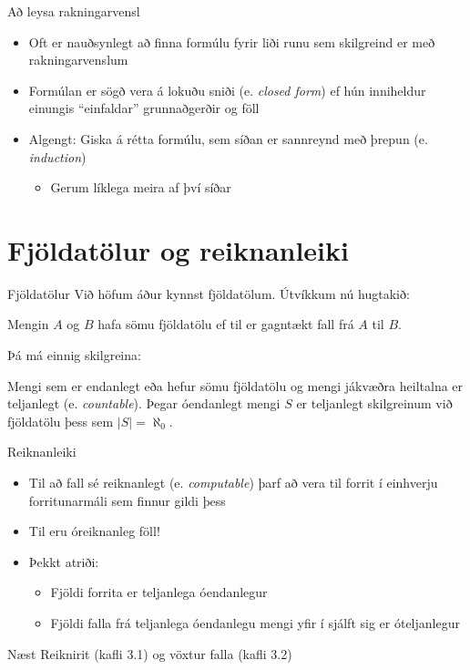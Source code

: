 \documentclass{beamer}
\begin{document}
\begin{frame}{Að leysa rakningarvensl}
\begin{itemize}
 \item Oft er nauðsynlegt að finna formúlu fyrir liði runu sem skilgreind er með rakningarvenslum
 \item Formúlan er sögð vera á lokuðu sniði (e. \emph{closed form}) ef hún inniheldur einungis ``einfaldar'' grunnaðgerðir og föll
 \item Algengt: Giska á rétta formúlu, sem síðan er sannreynd með þrepun (e. \emph{induction})
 \begin{itemize}
  \item Gerum líklega meira af því síðar
 \end{itemize}
\end{itemize}
\end{frame}


\section{Fjöldatölur og reiknanleiki}

\begin{frame}{Fjöldatölur}
Við höfum áður kynnst fjöldatölum. Útvíkkum nú hugtakið:

\begin{tcolorbox}[title=Eins fjöldatölur]
Mengin $A$ og $B$ hafa sömu fjöldatölu ef til er gagntækt fall frá $A$ til $B$.
\end{tcolorbox}

Þá má einnig skilgreina:

\begin{tcolorbox}[title=Teljanleiki]
Mengi sem er endanlegt eða hefur sömu fjöldatölu og mengi jákvæðra heiltalna er teljanlegt (e. \emph{countable}). Þegar óendanlegt mengi $S$ er teljanlegt skilgreinum við fjöldatölu þess sem $|S| = \aleph_0$.
\end{tcolorbox}
\end{frame}

\begin{frame}{Reiknanleiki}
\begin{itemize}
 \item Til að fall sé reiknanlegt (e. \emph{computable}) þarf að vera til forrit í einhverju forritunarmáli sem finnur gildi þess
 \item Til eru óreiknanleg föll!
 \item Þekkt atriði:
 \begin{itemize}
  \item Fjöldi forrita er teljanlega óendanlegur
  \item Fjöldi falla frá teljanlega óendanlegu mengi yfir í sjálft sig er óteljanlegur
 \end{itemize}
\end{itemize}
\end{frame}

\begin{frame}{Næst}
Reiknirit (kafli 3.1) og vöxtur falla (kafli 3.2)
\end{frame}
\end{document}
